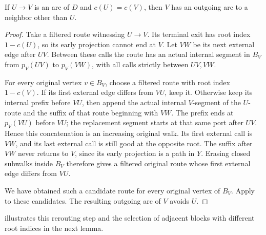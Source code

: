 \documentclass[USenglish, a4paper, thm-restate,numberwithinsect, cleveref]{lipics-v2021}
\begin{document}
\begin{lemma}\label{lem:characterization-same-index-rerouting}
If $U\to V$ is an arc of $D$ and $c(U)=c(V)$, then $V$ has an
outgoing arc to a neighbor other than $U$.
\end{lemma}
\begin{proof}
Take a filtered route witnessing $U\to V$. Its terminal exit has
root index $1-c(U)$, so its early projection cannot end at $V$. Let $VW$
be its next external edge after $UV$. Between these calls the route
has an actual internal segment in $B_V$ from $p_V(UV)$ to $p_V(VW)$,
with all calls strictly between $UV,VW$.

For every original vertex $v\in B_V$, choose a filtered route with
root index $1-c(V)$. If its first external edge differs from $VU$, keep
it. Otherwise keep its internal prefix before $VU$, then append the
actual internal $V$-segment of the $U$-route and the suffix of that
route beginning with $VW$. The prefix ends at $p_V(VU)$ before
$VU$; the replacement segment starts at that same port after $UV$.
Hence this concatenation is an increasing original walk. Its first
external call is $VW$, and its last external call is still good at
the opposite root. The suffix after $VW$ never returns to $V$,
since its early projection is a path in $Y$. Erasing closed
subwalks inside $B_V$ therefore gives a filtered original route
whose first external edge differs from $VU$.

We have obtained such a candidate route for every original vertex
of $B_V$. Apply  to these candidates.
The resulting outgoing arc of $V$ avoids $U$.
\end{proof}

 illustrates this rerouting step and the
selection of adjacent blocks with different root indices in the next
lemma.
\end{document}
